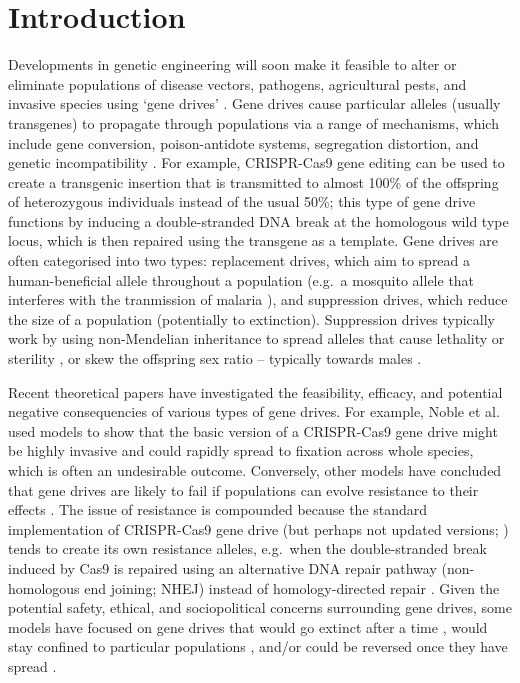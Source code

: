 \documentclass[]{rsos}%
\begin{document}
\hypertarget{introduction}{%
\section{Introduction}\label{introduction}}

Developments in genetic engineering will soon make it feasible to alter
or eliminate populations of disease vectors, pathogens, agricultural
pests, and invasive species using `gene drives'
\citep{gantz2015hi, hammond2016cr, wang2016cr, prowse2017do, kyrou2018cr, noble2018cu}.
Gene drives cause particular alleles (usually transgenes) to propagate
through populations via a range of mechanisms, which include gene
conversion, poison-antidote systems, segregation distortion, and genetic
incompatibility \citep{lindholm2016ec, champer2016ch, oberhofer2019cl}.
For example, CRISPR-Cas9 gene editing can be used to create a transgenic
insertion that is transmitted to almost 100\% of the offspring of
heterozygous individuals instead of the usual 50\%; this type of gene
drive functions by inducing a double-stranded DNA break at the
homologous wild type locus, which is then repaired using the transgene
as a template. Gene drives are often categorised into two types:
replacement drives, which aim to spread a human-beneficial allele
throughout a population (e.g.~a mosquito allele that interferes with the
tranmission of malaria \citep{gantz2015hi, marshall2015gene}), and
suppression drives, which reduce the size of a population (potentially
to extinction). Suppression drives typically work by using non-Mendelian
inheritance to spread alleles that cause lethality or sterility
\citep{hammond2016cr, kyrou2018cr, maselko2018ge}, or skew the offspring
sex ratio -- typically towards males
\citep{windbichler2008ta, galizi2014sy, beaghton2017ve, burt2018se, papathanos2018re}.

Recent theoretical papers have investigated the feasibility, efficacy,
and potential negative consequencies of various types of gene drives.
For example, Noble et al. \citep{noble2018cu} used models to show that
the basic version of a CRISPR-Cas9 gene drive might be highly invasive
and could rapidly spread to fixation across whole species, which is
often an undesirable outcome. Conversely, other models have concluded
that gene drives are likely to fail if populations can evolve resistance
to their effects \citep{drury2017cr, unckless2017ev}. The issue of
resistance is compounded because the standard implementation of
CRISPR-Cas9 gene drive (but perhaps not updated versions;
\citep{esvelt2014em, unckless2017ev, prowse2017do, kyrou2018cr}) tends
to create its own resistance alleles, e.g.~when the double-stranded
break induced by Cas9 is repaired using an alternative DNA repair
pathway (non-homologous end joining; NHEJ) instead of homology-directed
repair
\citep{gantz2015mu, gantz2015hi, hammond2016cr, wang2016cr, unckless2017ev}.
Given the potential safety, ethical, and sociopolitical concerns
surrounding gene drives, some models have focused on gene drives that
would go extinct after a time
\citep{min2017da, burt2018se, noble2019da}, would stay confined to
particular populations \citep{maselko2018ge, noble2019da}, and/or could
be reversed once they have spread \citep{vella2017ev}.
\end{document}
